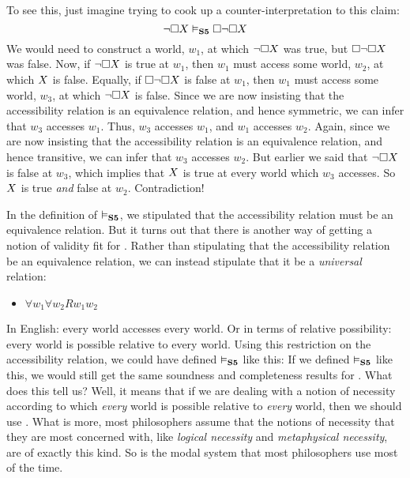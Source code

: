 To see this, just imagine trying to cook up a counter-interpretation to this claim:
\[
	\neg\Box X \vDash_{\mathbf{S5}}  \Box \neg\Box X
\]
We would need to construct a world, $w_1$, at which $\neg\Box X$ was true, but $\Box \neg\Box X$ was false.
Now, if $\neg\Box X$ is true at $w_1$, then $w_1$ must access some world, $w_2$, at which $X$ is false. Equally, if $\Box \neg\Box X$ is false at $w_1$, then $w_1$ must access some world, $w_3$, at which $\neg\Box X$ is false. Since we are now insisting that the accessibility relation is an equivalence relation, and hence symmetric, we can infer that $w_3$ accesses $w_1$. Thus, $w_3$ accesses $w_1$, and $w_1$ accesses $w_2$. Again, since we are now insisting that the accessibility relation is an equivalence relation, and hence transitive, we can infer that $w_3$ accesses $w_2$. But earlier we said that $\neg\Box X$ is false at $w_3$, which implies that $X$ is true at every world which $w_3$ accesses. So $X$ is true \emph{and} false at $w_2$. Contradiction!

In the definition of $\vDash_{\mathbf{S5}} $, we stipulated that the accessibility relation must be an equivalence relation. But it turns out that there is another way of getting a notion of validity fit for \mlSfive. Rather than stipulating that the accessibility relation be an equivalence relation, we can instead stipulate that it be a \emph{universal} relation:
\begin{itemize}
	\item $\forall w_1\forall w_2Rw_1w_2$
\end{itemize}
In English: every world accesses every world. Or in terms of relative possibility: every world is possible relative to every world. Using this restriction on the accessibility relation, we could have defined $\vDash_{\mathbf{S5}} $ like this:
If we defined $\vDash_{\mathbf{S5}} $ like this, we would still get the same soundness and completeness results for \mlSfive. What does this tell us? Well, it means that if we are dealing with a notion of necessity according to which \emph{every} world is possible relative to \emph{every} world, then we should use \mlSfive. What is more, most philosophers assume that the notions of necessity that they are most concerned with, like \emph{logical necessity} and \emph{metaphysical necessity}, are of exactly this kind. So \mlSfive{} is the modal system that most philosophers use most of the time.

